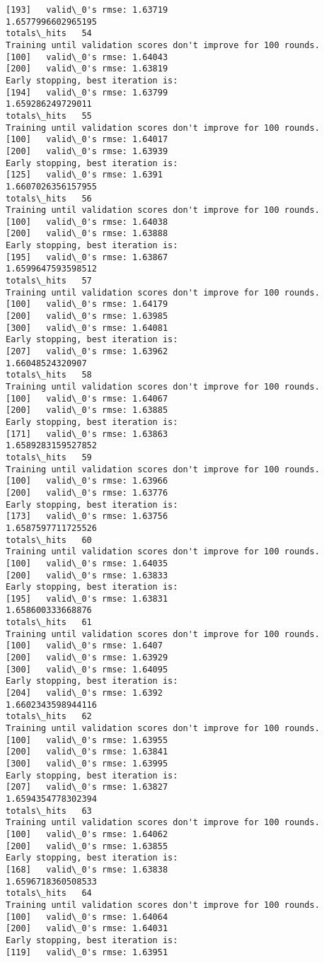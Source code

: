 \documentclass[11pt]{article}
\begin{document}
\begin{Verbatim}[commandchars=\\\{\}]
[193]	valid\_0's rmse: 1.63719
1.6577996602965195
totals\_hits   54
Training until validation scores don't improve for 100 rounds.
[100]	valid\_0's rmse: 1.64043
[200]	valid\_0's rmse: 1.63819
Early stopping, best iteration is:
[194]	valid\_0's rmse: 1.63799
1.659286249729011
totals\_hits   55
Training until validation scores don't improve for 100 rounds.
[100]	valid\_0's rmse: 1.64017
[200]	valid\_0's rmse: 1.63939
Early stopping, best iteration is:
[125]	valid\_0's rmse: 1.6391
1.6607026356157955
totals\_hits   56
Training until validation scores don't improve for 100 rounds.
[100]	valid\_0's rmse: 1.64038
[200]	valid\_0's rmse: 1.63888
Early stopping, best iteration is:
[195]	valid\_0's rmse: 1.63867
1.6599647593598512
totals\_hits   57
Training until validation scores don't improve for 100 rounds.
[100]	valid\_0's rmse: 1.64179
[200]	valid\_0's rmse: 1.63985
[300]	valid\_0's rmse: 1.64081
Early stopping, best iteration is:
[207]	valid\_0's rmse: 1.63962
1.66048524320907
totals\_hits   58
Training until validation scores don't improve for 100 rounds.
[100]	valid\_0's rmse: 1.64067
[200]	valid\_0's rmse: 1.63885
Early stopping, best iteration is:
[171]	valid\_0's rmse: 1.63863
1.6589283159527852
totals\_hits   59
Training until validation scores don't improve for 100 rounds.
[100]	valid\_0's rmse: 1.63966
[200]	valid\_0's rmse: 1.63776
Early stopping, best iteration is:
[173]	valid\_0's rmse: 1.63756
1.6587597711725526
totals\_hits   60
Training until validation scores don't improve for 100 rounds.
[100]	valid\_0's rmse: 1.64035
[200]	valid\_0's rmse: 1.63833
Early stopping, best iteration is:
[195]	valid\_0's rmse: 1.63831
1.658600333668876
totals\_hits   61
Training until validation scores don't improve for 100 rounds.
[100]	valid\_0's rmse: 1.6407
[200]	valid\_0's rmse: 1.63929
[300]	valid\_0's rmse: 1.64095
Early stopping, best iteration is:
[204]	valid\_0's rmse: 1.6392
1.6602343598944116
totals\_hits   62
Training until validation scores don't improve for 100 rounds.
[100]	valid\_0's rmse: 1.63955
[200]	valid\_0's rmse: 1.63841
[300]	valid\_0's rmse: 1.63995
Early stopping, best iteration is:
[207]	valid\_0's rmse: 1.63827
1.6594354778302394
totals\_hits   63
Training until validation scores don't improve for 100 rounds.
[100]	valid\_0's rmse: 1.64062
[200]	valid\_0's rmse: 1.63855
Early stopping, best iteration is:
[168]	valid\_0's rmse: 1.63838
1.6596718360508533
totals\_hits   64
Training until validation scores don't improve for 100 rounds.
[100]	valid\_0's rmse: 1.64064
[200]	valid\_0's rmse: 1.64031
Early stopping, best iteration is:
[119]	valid\_0's rmse: 1.63951

\end{Verbatim}
\end{document}
